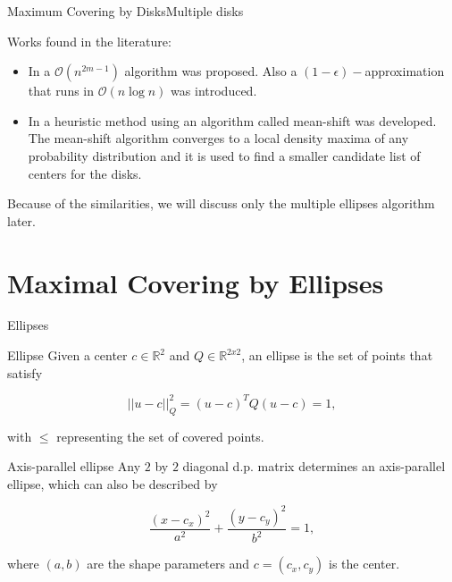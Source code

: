 \documentclass{beamer}
\newcommand{\R}{\mathbb{R}}
\newcommand{\bigO}{\mathscr{O}}
\begin{document}
\begin{frame}{Maximum Covering by Disks}{Multiple disks}
	
	Works found in the literature:
	
	\begin{itemize}
		\item In \autocite{cabello:2006} a $\bigO(n^{2m-1})$ algorithm was proposed. Also a $(1-\epsilon)-$approximation that runs in $\bigO(n\log{n})$ was introduced.
		
		\item In \autocite{zhou} a heuristic method using an algorithm called mean-shift was developed. The mean-shift algorithm converges to a local density maxima of any probability distribution and it is used to find a smaller candidate list of centers for the disks.
	\end{itemize}
	
	Because of the similarities, we will discuss only the multiple ellipses algorithm later.
	
\end{frame}
\section{Maximal Covering by Ellipses}

\begin{frame}{Ellipses}
	
	\begin{block}{Ellipse}
		Given a center $c \in \R^2$ and $Q \in \R^ {2x2}$, an ellipse is the set of points that satisfy
		
		\begin{equation*}
		||u-c||_Q^2 = (u-c)^TQ(u-c) = 1,
		\end{equation*}
		
		with $\le$ representing the set of covered points.
	\end{block}
	
	\begin{block}{Axis-parallel ellipse}
		Any $2$ by $2$ diagonal d.p. matrix determines an axis-parallel ellipse, which can also be described by
		
		\begin{equation*}
		\frac{(x-c_x)^2}{a^2} + \frac{(y-c_y)^2}{b^2} = 1,
		\end{equation*}
		
		where $(a,b)$ are the shape parameters and $c=(c_x,c_y)$ is the center.
	\end{block}
	
\end{frame}
\end{document}
